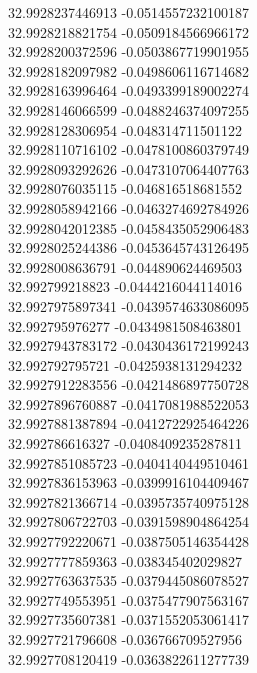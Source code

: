 {32.9928237446913	-0.0514557232100187\\
32.9928218821754	-0.0509184566966172\\
32.9928200372596	-0.0503867719901955\\
32.9928182097982	-0.0498606116714682\\
32.9928163996464	-0.0493399189002274\\
32.9928146066599	-0.0488246374097255\\
32.9928128306954	-0.048314711501122\\
32.9928110716102	-0.0478100860379749\\
32.9928093292626	-0.0473107064407763\\
32.9928076035115	-0.046816518681552\\
32.9928058942166	-0.0463274692784926\\
32.9928042012385	-0.0458435052906483\\
32.9928025244386	-0.0453645743126495\\
32.9928008636791	-0.044890624469503\\
32.992799218823	-0.0444216044114016\\
32.9927975897341	-0.0439574633086095\\
32.992795976277	-0.0434981508463801\\
32.9927943783172	-0.0430436172199243\\
32.992792795721	-0.0425938131294232\\
32.9927912283556	-0.0421486897750728\\
32.9927896760887	-0.0417081988522053\\
32.9927881387894	-0.0412722925464226\\
32.992786616327	-0.0408409235287811\\
32.9927851085723	-0.0404140449510461\\
32.9927836153963	-0.0399916104409467\\
32.9927821366714	-0.0395735740975128\\
32.9927806722703	-0.0391598904864254\\
32.9927792220671	-0.0387505146354428\\
32.9927777859363	-0.038345402029827\\
32.9927763637535	-0.0379445086078527\\
32.9927749553951	-0.0375477907563167\\
32.9927735607381	-0.0371552053061417\\
32.9927721796608	-0.036766709527956\\
32.9927708120419	-0.0363822611277739\\
}
